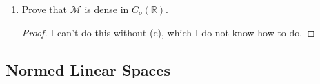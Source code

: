 \documentclass{article}
\begin{document}
\begin{enumerate}
\begin{enumerate}
\begin{proof}[Wait...]
                              function is not in the sup norm as far as I understand.
                        \end{proof}
                  \item Prove that $\mathcal{M}$ is dense in $C_o(\mathbb{R})$.
                        \begin{proof}
                              I can't do this without (c), which I do not know how to do.
                        \end{proof}
            \end{enumerate}
\end{enumerate}

\subsection{Normed Linear Spaces}
\end{document}
